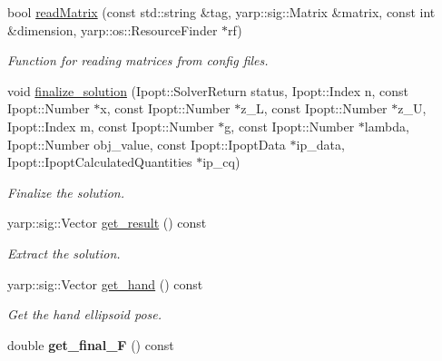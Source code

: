 \begin{DoxyCompactItemize}
bool \hyperlink{classgrasping__NLP_a8104499f39d0f3705760a50745510c14}{read\+Matrix} (const std\+::string \&tag, yarp\+::sig\+::\+Matrix \&matrix, const int \&dimension, yarp\+::os\+::\+Resource\+Finder $\ast$rf)
\begin{DoxyCompactList}\small\item\em Function for reading matrices from config files. \end{DoxyCompactList}\item 
void \hyperlink{classgrasping__NLP_a99ab31792445766535d8117299b57da8}{finalize\+\_\+solution} (Ipopt\+::\+Solver\+Return status, Ipopt\+::\+Index n, const Ipopt\+::\+Number $\ast$x, const Ipopt\+::\+Number $\ast$z\+\_\+L, const Ipopt\+::\+Number $\ast$z\+\_\+U, Ipopt\+::\+Index m, const Ipopt\+::\+Number $\ast$g, const Ipopt\+::\+Number $\ast$lambda, Ipopt\+::\+Number obj\+\_\+value, const Ipopt\+::\+Ipopt\+Data $\ast$ip\+\_\+data, Ipopt\+::\+Ipopt\+Calculated\+Quantities $\ast$ip\+\_\+cq)
\begin{DoxyCompactList}\small\item\em Finalize the solution. \end{DoxyCompactList}\item 
yarp\+::sig\+::\+Vector \hyperlink{classgrasping__NLP_a15ce27b41ee64c471a66ea3f9db49381}{get\+\_\+result} () const 
\begin{DoxyCompactList}\small\item\em Extract the solution. \end{DoxyCompactList}\item 
yarp\+::sig\+::\+Vector \hyperlink{classgrasping__NLP_a1c012d56ae1dc44263eac74861b59008}{get\+\_\+hand} () const 
\begin{DoxyCompactList}\small\item\em Get the hand ellipsoid pose. \end{DoxyCompactList}\item 
double {\bfseries get\+\_\+final\+\_\+F} () const \label{classgrasping__NLP_ad6facc271a6368426df5ffa995abe8f5}

\end{DoxyCompactItemize}
